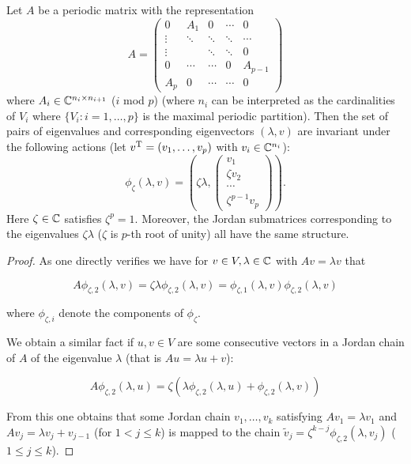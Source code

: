 \documentclass{article}
\begin{document}
\begin{lemma}
Let $A$ be a periodic matrix with the representation 
\begin{equation}
A = 
\begin{pmatrix}
0 & A_1 & 0 & \cdots & 0\\
\vdots & \ddots & \ddots & \ddots & \cdots\\
\vdots &  & \ddots & \ddots & 0\\
0 & \cdots & \cdots & 0 & A_{p-1}\\
A_p & 0 & \cdots & \cdots & 0
\end{pmatrix}
\end{equation}
where $A_i\in\mathbb{C}^{n_i\times n_{i+1}}$ ($i$ mod $p$) (where $n_i$ can be interpreted as the cardinalities of $V_i$ where $\{V_i:i=1,\ldots,p\}$ is the maximal periodic partition). Then the set of pairs of eigenvalues and corresponding eigenvectors $(\lambda,v)$ are invariant under the following actions (let $v^{\operatorname{T}}=(v_1,\ldots,v_p)$ with $v_i\in\mathbb{C}^{n_i}$):
\begin{equation}
\phi_{\zeta}(\lambda,v)=\left(\zeta\lambda,\begin{pmatrix}
v_1 \\ \zeta v_2 \\ \cdots \\ \zeta^{p-1} v_p
\end{pmatrix}
\right)\text{.}
\end{equation}
Here $\zeta\in\mathbb{C}$ satisfies $\zeta^p=1$. Moreover, the Jordan submatrices corresponding to the eigenvalues $\zeta\lambda$ ($\zeta$ is $p$-th root of unity) all have the same structure.
\end{lemma}

\begin{proof}
As one directly verifies we have for $v\in V,\lambda\in\mathbb{C}$ with $Av=\lambda v$ that

\begin{equation}
A\phi_{\zeta,2}(\lambda,v)=\zeta\lambda \phi_{\zeta,2}(\lambda,v)=\phi_{\zeta,1}(\lambda,v) \phi_{\zeta,2}(\lambda,v)
\end{equation}

where $\phi_{\zeta,i}$ denote the components of $\phi_\zeta$.

We obtain a similar fact if $u,v\in V$ are some consecutive vectors in a Jordan chain of $A$ of the eigenvalue $\lambda$ (that is $Au = \lambda u+v$):

\begin{equation}
A\phi_{\zeta,2}(\lambda,u)=\zeta(\lambda \phi_{\zeta,2}(\lambda,u) + \phi_{\zeta,2}(\lambda,v))
\end{equation}

From this one obtains that some Jordan chain $v_1,\ldots,v_k$ satisfying
$Av_1 = \lambda v_1$ and $Av_j = \lambda v_j + v_{j-1}$ (for $1<j\leq k$) is mapped to the chain $\tilde{v}_j = \zeta^{k-j}\phi_{\zeta,2}(\lambda,v_j)$ ($1\leq j \leq k$).
\end{proof}
\end{document}
